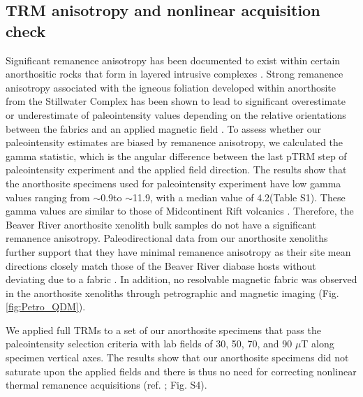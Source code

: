 \documentclass[9pt,twocolumn,twoside,lineno]{pnas-new}
\begin{document}
\subsection*{TRM anisotropy and nonlinear acquisition check}
Significant remanence anisotropy has been documented to exist within certain anorthositic rocks that form in layered intrusive complexes \cite{Selkin2000a, Feinberg2006a}. Strong remanence anisotropy associated with the igneous foliation developed within anorthosite from the Stillwater Complex has been shown to lead to significant overestimate or underestimate of paleointensity values depending on the relative orientations between the fabrics and an applied magnetic field \cite{Selkin2000a}. To assess whether our paleointensity estimates are biased by remanence anisotropy, we calculated the gamma statistic, which is the angular difference between the last pTRM step of paleointensity experiment and the applied field direction. The results show that the anorthosite specimens used for paleointensity experiment have low gamma values ranging from $\sim$0.9\textdegree to $\sim$11.9\textdegree, with a median value of 4.2\textdegree (Table S1). These gamma values are similar to those of Midcontinent Rift volcanics \cite{Sprain2018a}. Therefore, the Beaver River anorthosite xenolith bulk samples do not have a significant remanence anisotropy. Paleodirectional data from our anorthosite xenoliths further support that they have minimal remanence anisotropy as their site mean directions closely match those of the Beaver River diabase hosts without deviating due to a fabric \cite{Zhang2021b}. In addition, no resolvable magnetic fabric was observed in the anorthosite xenoliths through petrographic and magnetic imaging (Fig. \ref{fig:Petro_QDM}). 

We applied full TRMs to a set of our anorthosite specimens that pass the paleointensity selection criteria with lab fields of 30, 50, 70, and 90 $\mu$T along specimen vertical axes. The results show that our anorthosite specimens did not saturate upon the applied fields and there is thus no need for correcting nonlinear thermal remanence acquisitions (ref. \citealp{Selkin2007a}; Fig. S4). 

\end{document}

